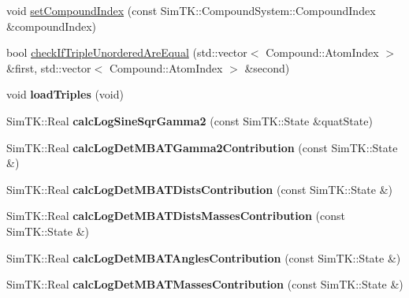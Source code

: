 \begin{DoxyCompactItemize}
\item 
void \hyperlink{classTopology_a1a1124e3554ff2315926a54a0315fdbe}{set\+Compound\+Index} (const Sim\+T\+K\+::\+Compound\+System\+::\+Compound\+Index \&compound\+Index)
\item 
bool \hyperlink{classTopology_abf5a2669d0e20677eaadd6d87b2f8795}{check\+If\+Triple\+Unordered\+Are\+Equal} (std\+::vector$<$ Compound\+::\+Atom\+Index $>$ \&first, std\+::vector$<$ Compound\+::\+Atom\+Index $>$ \&second)
\item 
void {\bfseries load\+Triples} (void)\hypertarget{classTopology_a4b4022faf8d873713322e502821e9443}{}\label{classTopology_a4b4022faf8d873713322e502821e9443}

\item 
Sim\+T\+K\+::\+Real {\bfseries calc\+Log\+Sine\+Sqr\+Gamma2} (const Sim\+T\+K\+::\+State \&quat\+State)\hypertarget{classTopology_a35525d2a7aef61553490398165cbbfb8}{}\label{classTopology_a35525d2a7aef61553490398165cbbfb8}

\item 
Sim\+T\+K\+::\+Real {\bfseries calc\+Log\+Det\+M\+B\+A\+T\+Gamma2\+Contribution} (const Sim\+T\+K\+::\+State \&)\hypertarget{classTopology_aa6ce96a0e7660584b72f64d132f5a611}{}\label{classTopology_aa6ce96a0e7660584b72f64d132f5a611}

\item 
Sim\+T\+K\+::\+Real {\bfseries calc\+Log\+Det\+M\+B\+A\+T\+Dists\+Contribution} (const Sim\+T\+K\+::\+State \&)\hypertarget{classTopology_a50900405ea47b713fea6d12d046585db}{}\label{classTopology_a50900405ea47b713fea6d12d046585db}

\item 
Sim\+T\+K\+::\+Real {\bfseries calc\+Log\+Det\+M\+B\+A\+T\+Dists\+Masses\+Contribution} (const Sim\+T\+K\+::\+State \&)\hypertarget{classTopology_a20dbb8725aff8575fe6c889d714fb480}{}\label{classTopology_a20dbb8725aff8575fe6c889d714fb480}

\item 
Sim\+T\+K\+::\+Real {\bfseries calc\+Log\+Det\+M\+B\+A\+T\+Angles\+Contribution} (const Sim\+T\+K\+::\+State \&)\hypertarget{classTopology_a8a9060bb644aa335e2cbbb1e491388be}{}\label{classTopology_a8a9060bb644aa335e2cbbb1e491388be}

\item 
Sim\+T\+K\+::\+Real {\bfseries calc\+Log\+Det\+M\+B\+A\+T\+Masses\+Contribution} (const Sim\+T\+K\+::\+State \&)\hypertarget{classTopology_a466dfbf5b7c76d21f8c1261db415a445}{}\label{classTopology_a466dfbf5b7c76d21f8c1261db415a445}


\end{DoxyCompactItemize}
